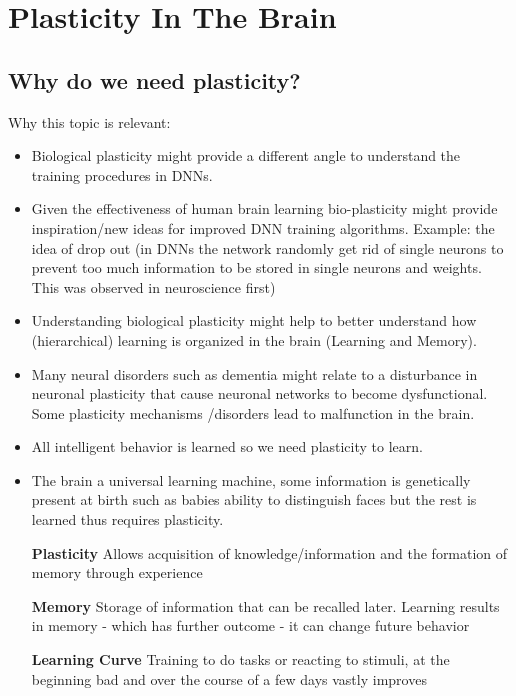 \documentclass[main]{subfiles}
\begin{document}
\newpage
\section{Plasticity In The Brain}

\subsection{Why do we need plasticity?}
Why this topic is relevant:
\begin{itemize}
    \item Biological plasticity might provide a different angle to understand the training procedures in DNNs.
    \item Given the effectiveness of human brain learning bio-plasticity might provide inspiration/new ideas for improved DNN training algorithms. Example: the idea of drop out (in DNNs the network randomly get rid of single neurons to prevent too much information to be stored in single neurons and weights. This was observed in neuroscience first)
    \item Understanding biological plasticity might help to better understand how (hierarchical) learning is organized in the brain (Learning and Memory).
    \item Many neural disorders such as dementia might relate to a disturbance in neuronal plasticity that cause neuronal networks to become dysfunctional. Some plasticity mechanisms /disorders lead to malfunction in the brain.
    \item All intelligent behavior is learned so we need plasticity to learn. 
    \item The brain a universal learning machine, some information is genetically present at birth such as babies ability to distinguish faces but the rest is learned thus requires plasticity. 
\end{itemize}
\begin{itemize}
    \item[\textbf{Plasticity}] Allows acquisition of knowledge/information and the formation of memory through experience
    \item[\textbf{Memory}] Storage of information that can be recalled later. Learning results in memory - which has further outcome - it can change future behavior
    \item[\textbf{Learning Curve}] Training to do tasks or reacting to stimuli, at the beginning bad and over the course of a few days vastly improves
\end{itemize}
\end{document}
